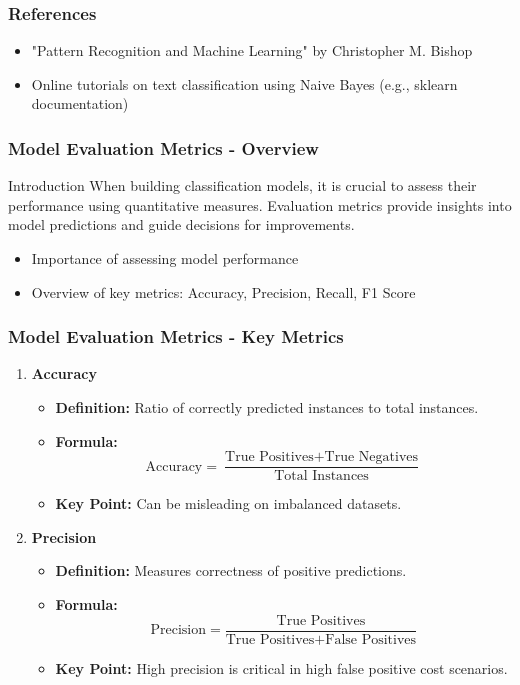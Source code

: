 \documentclass[aspectratio=169]{beamer}
\begin{document}
\begin{frame}[fragile]
    \frametitle{References}
    \begin{itemize}
        \item "Pattern Recognition and Machine Learning" by Christopher M. Bishop
        \item Online tutorials on text classification using Naive Bayes (e.g., sklearn documentation)
    \end{itemize}
\end{frame}

\begin{frame}[fragile]
    \frametitle{Model Evaluation Metrics - Overview}
    \begin{block}{Introduction}
        When building classification models, it is crucial to assess their performance using quantitative measures. Evaluation metrics provide insights into model predictions and guide decisions for improvements.
    \end{block}
    \begin{itemize}
        \item Importance of assessing model performance
        \item Overview of key metrics: Accuracy, Precision, Recall, F1 Score
    \end{itemize}
\end{frame}

\begin{frame}[fragile]
    \frametitle{Model Evaluation Metrics - Key Metrics}
    \begin{enumerate}
        \item \textbf{Accuracy}
            \begin{itemize}
                \item \textbf{Definition:} Ratio of correctly predicted instances to total instances.
                \item \textbf{Formula:} 
                \[
                \text{Accuracy} = \frac{\text{True Positives} + \text{True Negatives}}{\text{Total Instances}}
                \]
                \item \textbf{Key Point:} Can be misleading on imbalanced datasets.
            \end{itemize}

        \item \textbf{Precision}
            \begin{itemize}
                \item \textbf{Definition:} Measures correctness of positive predictions.
                \item \textbf{Formula:} 
                \[
                \text{Precision} = \frac{\text{True Positives}}{\text{True Positives} + \text{False Positives}}
                \]
                \item \textbf{Key Point:} High precision is critical in high false positive cost scenarios.
            \end{itemize}
    \end{enumerate}
\end{frame}
\end{document}
